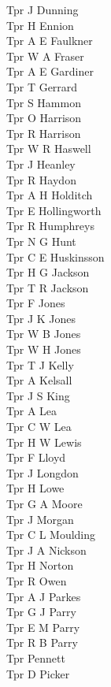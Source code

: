 \begin{multicols}{2}
  Tpr J Dunning \\
  Tpr H Ennion \\
  Tpr A E Faulkner \\
  Tpr W A Fraser \\
  Tpr A E Gardiner \\
  Tpr T Gerrard \\
  Tpr S Hammon \\
  Tpr O Harrison \\
  Tpr R Harrison \\
  Tpr W R Haswell \\
  Tpr J Heanley \\
  Tpr R Haydon \\
  Tpr A H Holditch \\
  Tpr E Hollingworth \\
  Tpr R Humphreys \\
  Tpr N G Hunt \\
  Tpr C E Huskinsson \\
  Tpr H G Jackson \\
  Tpr T R Jackson \\
  Tpr F Jones \\
  Tpr J K Jones \\
  Tpr W B Jones \\
  Tpr W H Jones \\
  Tpr T J Kelly \\
  Tpr A Kelsall \\
  Tpr J S King \\
  Tpr A Lea \\
  Tpr C W Lea \\
  Tpr H W Lewis \\
  Tpr F Lloyd \\
  Tpr J Longdon \\
  Tpr H Lowe \\
  Tpr G A Moore \\
  Tpr J Morgan \\
  Tpr C L Moulding \\
  Tpr J A Nickson \\
  Tpr H Norton \\
  Tpr R Owen \\
  Tpr A J Parkes \\
  Tpr G J Parry \\
  Tpr E M Parry \\
  Tpr R B Parry \\
  Tpr Pennett \\
  Tpr D Picker \\

\end{multicols}
